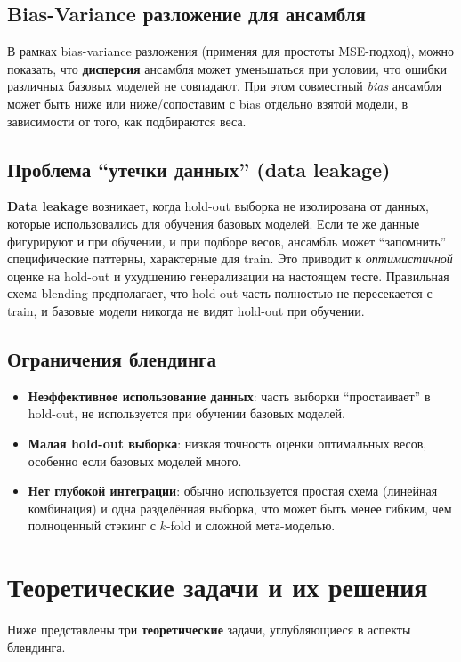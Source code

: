 \subsection{Bias-Variance разложение для ансамбля}
В рамках bias-variance разложения (применяя для простоты MSE-подход), можно показать, что \textbf{дисперсия} ансамбля может уменьшаться при условии, что ошибки различных базовых моделей не совпадают. При этом совместный \textit{bias} ансамбля может быть ниже или ниже/сопоставим с bias отдельно взятой модели, в зависимости от того, как подбираются веса.

\subsection{Проблема ``утечки данных'' (data leakage)}
\textbf{Data leakage} возникает, когда hold-out выборка не изолирована от данных, которые использовались для обучения базовых моделей. Если те же данные фигурируют и при обучении, и при подборе весов, ансамбль может ``запомнить'' специфические паттерны, характерные для train. Это приводит к \textit{оптимистичной} оценке на hold-out и ухудшению генерализации на настоящем тесте. Правильная схема blending предполагает, что hold-out часть полностью не пересекается с train, и базовые модели никогда не видят hold-out при обучении.

\subsection{Ограничения блендинга}
\begin{itemize}
    \item \textbf{Неэффективное использование данных}: часть выборки ``простаивает'' в hold-out, не используется при обучении базовых моделей.
    \item \textbf{Малая hold-out выборка}: низкая точность оценки оптимальных весов, особенно если базовых моделей много.
    \item \textbf{Нет глубокой интеграции}: обычно используется простая схема (линейная комбинация) и одна разделённая выборка, что может быть менее гибким, чем полноценный стэкинг с $k$-fold и сложной мета-моделью.
\end{itemize}

\section{Теоретические задачи и их решения}

Ниже представлены три \textbf{теоретические} задачи, углубляющиеся в аспекты блендинга.

